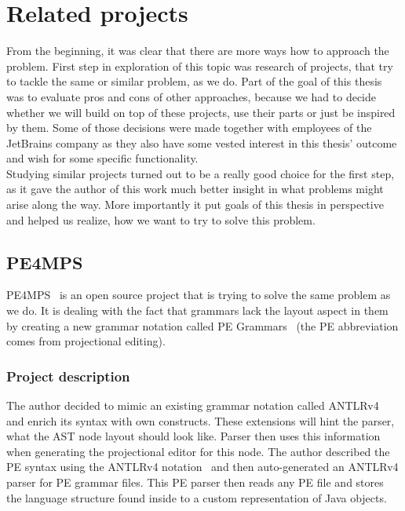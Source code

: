 \chapter{Related projects}
\label{chap:related_projects}

From the beginning, it was clear that there are more ways how to approach the problem.
First step in exploration of this topic was research of projects, that try to tackle the same or similar problem, as we do.
Part of the goal of this thesis was to evaluate pros and cons of other approaches, because we had to decide whether we will build on top of these projects, use their parts or just be inspired by them.
Some of those decisions were made together with employees of the JetBrains company as they also have some vested interest in this thesis' outcome and wish for some specific functionality.
\\

Studying similar projects turned out to be a really good choice for the first step, as it gave the author of this work much better insight in what problems might arise along the way.
More importantly it put goals of this thesis in perspective and helped us realize, how we want to try to solve this problem.

\section{PE4MPS}
PE4MPS~\cite{PE4MPS} is an open source project that is trying to solve the same problem as we do.
It is dealing with the fact that grammars lack the layout aspect in them by creating a new grammar notation called PE Grammars~\cite{PE} (the PE abbreviation comes from projectional editing).

\subsection{Project description}
The author decided to mimic an existing grammar notation called ANTLRv4~\cite{ANTLR4} and enrich its syntax with own constructs.
These extensions will hint the parser, what the AST node layout should look like.
Parser then uses this information when generating the projectional editor for this node.
The author described the PE syntax using the ANTLRv4 notation~\cite{ANTLR4reference} and then auto-generated an ANTLRv4 parser for PE grammar files.
This PE parser then reads any PE file and stores the language structure found inside to a custom representation of Java objects.
\\

